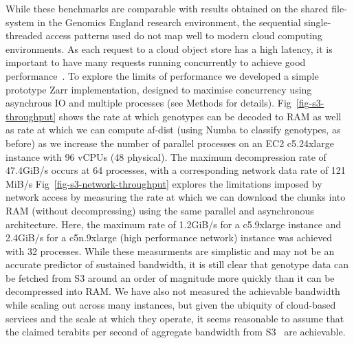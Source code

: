\documentclass[a4paper,num-refs]{oup-contemporary}
\begin{document}
While these benchmarks are comparable with results obtained on the
shared file-system in the Genomics England research environment,
the sequential single-threaded access patterns used do not map
well to modern cloud computing environments.
As each request to a cloud object store has a high latency, it
is important to have many requests running concurrently to achieve
good performance~\citep{durner2023exploiting}.
To explore the limits of performance we developed a simple prototype
Zarr implementation, designed to maximise concurrency using asynchrous
IO and multiple processes (see Methods for details).
Fig~\ref{fig-s3-throughput} shows the rate at which genotypes
can be decoded to RAM as well as rate at which we can compute
af-dist (using Numba to classify genotypes, as before)
as we increase the number of parallel processes on
an EC2 c5.24xlarge instance with 96 vCPUs (48 physical).
The maximum decompression rate of 47.4GiB/s
occurs at 64 processes, with a corresponding
network data rate of 121 MiB/s
Fig~\ref{fig-s3-network-throughput} explores the limitations imposed by
network access by measuring the rate at which we can download the chunks
into RAM (without decompressing) using the same parallel and asynchronous
architecture. Here, the maximum rate of 1.2GiB/s for a c5.9xlarge instance
and 2.4GiB/s for a c5n.9xlarge (high performance network) instance
was achieved with 32 processes. 
While these measurments are simplistic and may not be an 
accurate predictor of sustained bandwidth, it is still clear that 
genotype data can be fetched
from S3 around an order of magnitude more quickly 
than it can be decompressed into RAM. 
We have also not measured
the achievable bandwidth while scaling out across many instances,
but given the ubiquity of cloud-based services and the scale 
at which they operate, it seems reasonable to assume that the claimed
terabits per second of aggregate bandwidth from
S3~\cite{s3-performance-optimising} are achievable.
 
\end{document}
